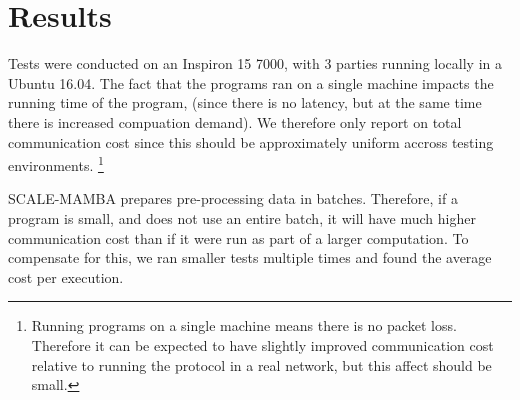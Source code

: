\section{Results}

Tests were conducted on an Inspiron 15 7000, with 3 parties
running locally in a Ubuntu 16.04.
The fact that the programs ran on a single machine impacts
the running time of the program, (since there is no latency,
but at the same time there is increased compuation demand).
We therefore only report on total communication cost
since this should be approximately uniform accross testing
environments. 
\footnote{Running programs on a single machine means there
is no packet loss. Therefore it can be expected to have
slightly improved communication cost relative to running
the protocol in a real network, but this affect should be small.}

SCALE-MAMBA prepares pre-processing data in batches.
Therefore, if a program is small, and does not use 
an entire batch, it will have much higher communication cost
than if it were run as part of a larger computation.
To compensate for this, we ran smaller tests multiple times and 
found the average cost per execution.

